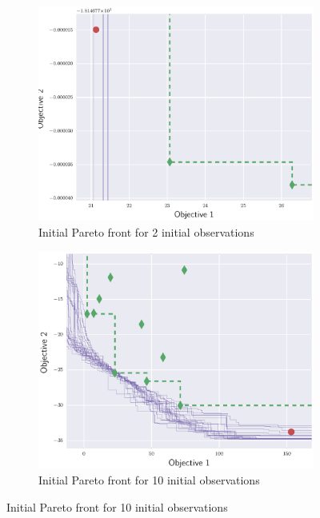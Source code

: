\documentclass{article}
\begin{document}
\begin{figure}[!t]
\centering
    \begin{subfigure}{0.45\textwidth}
        \includegraphics[width=\textwidth]{li_ex1_00}
        \caption{Initial Pareto front for 2 initial observations}
        \label{li_initial}
    \end{subfigure}
    \hfill
    \begin{subfigure}{0.45\textwidth}
        \includegraphics[width=\textwidth]{hi_ex1_00}
        \caption{Initial Pareto front for 10 initial observations}
        \label{hi_intial}
    \end{subfigure}
    \hfill

\end{figure}
\end{document}
